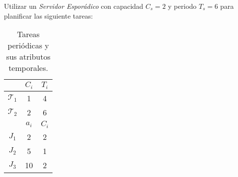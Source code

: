 \begin{ejercicio}\label{ej:rel4_18}
    Utilizar un \textit{Servidor Esporádico} con capacidad $C_s=2$ y periodo $T_s=6$ para planificar las siguiente tareas:
    \begin{table}[H]
    \centering
    \begin{tabular}{|c|c|c|}
        \hline
        & $C_i$ & $T_i$ \\
        \hline
        $\mathcal{T}_1$ & 1 & 4 \\
        \hline
        $\mathcal{T}_2$ & 2 & 6 \\
        \hline
                        & $a_i$ & $C_i$ \\
        \hline
        $J_1$ & 2 & 2 \\
        \hline
        $J_2$ & 5 & 1 \\
        \hline
        $J_3$ & 10 & 2 \\
        \hline
    \end{tabular}
    \caption{Tareas periódicas y sus atributos temporales.}
    \label{tab:4_18}
    \end{table}
\end{ejercicio}
